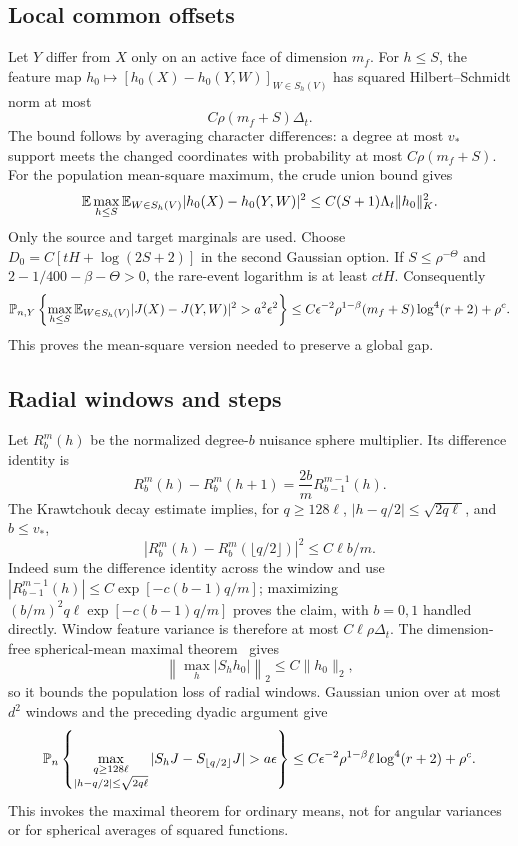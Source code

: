 \subsection{Local common offsets}
Let $Y$ differ from $X$ only on an active face of dimension $m_f$.
For $h\le S$, the feature map
$h_0\mapsto[h_0(X)-h_0(Y,W)]_{W\in S_h(V)}$ has squared
Hilbert--Schmidt norm at most
\[
 C\rho(m_f+S)\Delta_t.
\]
The bound follows by averaging character differences: a degree at most
$v_*$ support meets the changed coordinates with probability at most
$C\rho(m_f+S)$. For the population mean-square maximum, the crude union
bound gives
\[
 \mathbb E\max_{h\le S}\mathbb E_{W\in S_h(V)}|h_0(X)-h_0(Y,W)|^2
       \le C(S+1)\Lambda_t\|h_0\|_K^2.
\]
Only the source and target marginals are used. Choose
$D_0=C[tH+\log(2S+2)]$ in the second Gaussian option. If
$S\le\rho^{-\Theta}$ and $2-1/400-\beta-\Theta>0$, the rare-event
logarithm is at least $ctH$. Consequently
\begin{equation}\label{eq:local-middle-pac}
 \mathbb P_{n,Y}\left\{
 \max_{h\le S}\mathbb E_{W\in S_h(V)}|J(X)-J(Y,W)|^2>a^2\epsilon^2
 \right\}
 \le C\epsilon^{-2}\rho^{1-\beta}(m_f+S)\log^4(r+2)+\rho^c.
\end{equation}
This proves the mean-square version needed to preserve a global gap.

\subsection{Radial windows and steps}
Let $R_b^m(h)$ be the normalized degree-$b$ nuisance sphere multiplier.
Its difference identity is
\[
 R_b^m(h)-R_b^m(h+1)=\frac{2b}mR_{b-1}^{m-1}(h).
\]
The Krawtchouk decay estimate implies, for $q\ge128\ell$,
$|h-q/2|\le\sqrt{2q\ell}$, and $b\le v_*$,
\[
 |R_b^m(h)-R_b^m(\lfloor q/2\rfloor)|^2
 \le C\ell b/m.
\]
Indeed sum the difference identity across the window and use
$|R_{b-1}^{m-1}(h)|\le C\exp[-c(b-1)q/m]$; maximizing
$(b/m)^2q\ell\exp[-c(b-1)q/m]$ proves the claim, with $b=0,1$
handled directly. Window feature variance is therefore at most
$C\ell\rho\Delta_t$.
The dimension-free spherical-mean maximal theorem~\cite{HKS} gives
\[
 \left\|\max_h|S_hh_0|\right\|_2\le C\|h_0\|_2,
\]
so it bounds the population loss of radial windows. Gaussian union over
at most $d^2$ windows and the preceding dyadic argument give
\begin{equation}\label{eq:middle-window-pac}
 \mathbb P_n\left\{\max_{\substack{q\ge128\ell\\|h-q/2|\le\sqrt{2q\ell}}}|S_hJ-S_{\lfloor q/2\rfloor}J|
                                   >a\epsilon\right\}
 \le C\epsilon^{-2}\rho^{1-\beta}\ell\log^4(r+2)+\rho^c.
\end{equation}
This invokes the maximal theorem for ordinary means, not for angular
variances or for spherical averages of squared functions.

